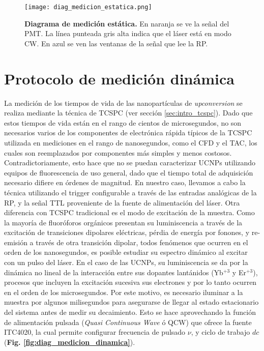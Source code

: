 \begin{SCfigure}
     \centering
     \texttt{[image: diag\_medicion\_estatica.png]}
     \caption{\textbf{Diagrama de medición estática.} En naranja se ve la señal del PMT. La línea punteada gris alta indica que el láser está en modo CW. En azul se ven las ventanas de la señal que lee la RP.}
     \label{fig:diag_medicion_estatica}
\end{SCfigure}


\section{Protocolo de medición dinámica} \label{sec:proceso_dinamico}

La medición de los tiempos de vida de las nanopartículas de \textit{upconversion} se realiza mediante la técnica de TCSPC (ver sección \ref{sec:intro_tcspc}).
Dado que estos tiempos de vida están en el rango de cientos de microsegundos, no son necesarios varios de los componentes de electrónica rápida típicos de la TCSPC utilizada en mediciones en el rango de nanosegundos, como el CFD y el TAC, los cuales son reemplazados por componentes más simples y menos costosos.
Contradictoriamente, esto hace que no se puedan caracterizar UCNPs utilizando equipos de fluorescencia de uso general, dado que el tiempo total de adquisición necesario difiere en órdenes de magnitud.
En nuestro caso, llevamos a cabo la técnica utilizando el trigger configurable a través de las entradas analógicas de la RP, y la señal TTL proveniente de la fuente de alimentación del láser.
Otra diferencia con TCSPC tradicional es el modo de excitación de la muestra.
Como la mayoría de fluoróforos orgánicos presentan su luminiscencia a través de la excitación de transiciones dipolares eléctricas, pérdia de energía por fonones, y re-emisión a través de otra transición dipolar, todos fenómenos que ocurren en el orden de los nanosegundos, es posible estudiar su espectro dinámico al excitar con un pulso del láser.
En el caso de las UCNPs, su luminiscencia se da por la dinámica no lineal de la interacción entre sus dopantes lantánidos (Yb$^{+3}$ y Er$^{+3}$), procesos que incluyen la excitación sucesiva sus electrones y por lo tanto ocurren en el orden de los microsegundos.
Por este motivo, es necesario iluminar a la muestra por algunos milisegundos para asegurarse de llegar al estado estacionario del sistema antes de medir su decaimiento.
Esto se hace aprovechando la función de alimentación pulsada (\textit{Quasi Continuous Wave} ó QCW) que ofrece la fuente ITC4020, la cual permite configurar frecuencia de pulsado $\nu$, y ciclo de trabajo $dc$ (\textbf{Fig. \ref{fig:diag_medicion_dinamica}}).

